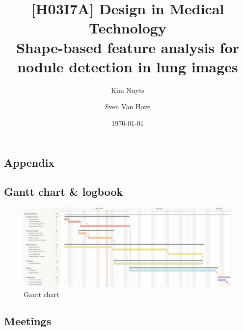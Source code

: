 \documentclass[twoside, 10pt, twoside]{article}
\title
{
	[H03I7A] Design in Medical Technology\\
	Shape-based feature analysis for\\
	nodule detection in lung images
}
\author{Kim Nuyts \and Sven Van Hove}
\date{\today}
\numberwithin{equation}{section}
\begin{document}
%

\onecolumn
\tableofcontents
\clearpage

\setlength{\parindent}{0pt} %
\setlength{\parskip}{2ex plus 1ex minus 1ex} %


\clearpage
\twocolumn













\clearpage
\onecolumn


\clearpage
\appendix
\begin{landscape}
\section{Appendix}
%

\subsection{Gantt chart \& logbook}
\begin{figure}[htp]
  \includegraphics[width=\linewidth]{appendix/gantt.png}
  \caption{Gantt chart}
  \label{fig:gantt}
\end{figure}


\end{landscape}

\subsection{Meetings}







\end{document}
